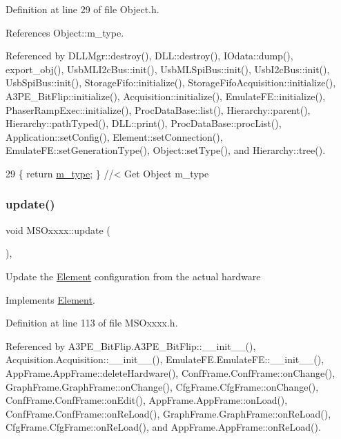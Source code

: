 Definition at line 29 of file Object.\+h.



References Object\+::m\+\_\+type.



Referenced by D\+L\+L\+Mgr\+::destroy(), D\+L\+L\+::destroy(), I\+Odata\+::dump(), export\+\_\+obj(), Usb\+M\+L\+I2c\+Bus\+::init(), Usb\+M\+L\+Spi\+Bus\+::init(), Usb\+I2c\+Bus\+::init(), Usb\+Spi\+Bus\+::init(), Storage\+Fifo\+::initialize(), Storage\+Fifo\+Acquisition\+::initialize(), A3\+P\+E\+\_\+\+Bit\+Flip\+::initialize(), Acquisition\+::initialize(), Emulate\+F\+E\+::initialize(), Phaser\+Ramp\+Exec\+::initialize(), Proc\+Data\+Base\+::list(), Hierarchy\+::parent(), Hierarchy\+::path\+Typed(), D\+L\+L\+::print(), Proc\+Data\+Base\+::proc\+List(), Application\+::set\+Config(), Element\+::set\+Connection(), Emulate\+F\+E\+::set\+Generation\+Type(), Object\+::set\+Type(), and Hierarchy\+::tree().


\begin{DoxyCode}
29 \{ \textcolor{keywordflow}{return} \hyperlink{classObject_a457a600fe8c00eb1034374f75110a78c}{m\_type};       \} \textcolor{comment}{//< Get Object m\_type}
\end{DoxyCode}
\mbox{\label{classMSOxxxx_a09452d6e75cd9adfaec93606fbb998dc}} 
\subsubsection{\texorpdfstring{update()}{update()}}
{\footnotesize\ttfamily void M\+S\+Oxxxx\+::update (\begin{DoxyParamCaption}{ }\end{DoxyParamCaption})\hspace{0.3cm}{\ttfamily [inline]}, {\ttfamily [virtual]}}

Update the \hyperlink{classElement}{Element} configuration from the actual hardware 

Implements \hyperlink{classElement_a4e6c83efae95616ebddd03c793a26661}{Element}.



Definition at line 113 of file M\+S\+Oxxxx.\+h.



Referenced by A3\+P\+E\+\_\+\+Bit\+Flip.\+A3\+P\+E\+\_\+\+Bit\+Flip\+::\+\_\+\+\_\+init\+\_\+\+\_\+(), Acquisition.\+Acquisition\+::\+\_\+\+\_\+init\+\_\+\+\_\+(), Emulate\+F\+E.\+Emulate\+F\+E\+::\+\_\+\+\_\+init\+\_\+\+\_\+(), App\+Frame.\+App\+Frame\+::delete\+Hardware(), Conf\+Frame.\+Conf\+Frame\+::on\+Change(), Graph\+Frame.\+Graph\+Frame\+::on\+Change(), Cfg\+Frame.\+Cfg\+Frame\+::on\+Change(), Conf\+Frame.\+Conf\+Frame\+::on\+Edit(), App\+Frame.\+App\+Frame\+::on\+Load(), Conf\+Frame.\+Conf\+Frame\+::on\+Re\+Load(), Graph\+Frame.\+Graph\+Frame\+::on\+Re\+Load(), Cfg\+Frame.\+Cfg\+Frame\+::on\+Re\+Load(), and App\+Frame.\+App\+Frame\+::on\+Re\+Load().


